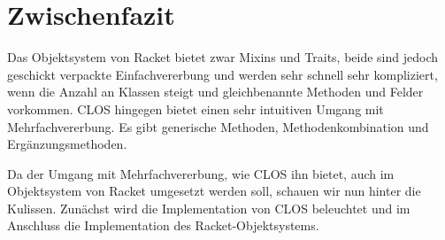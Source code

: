 \section{Zwischenfazit}
Das Objektsystem von Racket bietet zwar Mixins und Traits, beide sind jedoch geschickt verpackte Einfachvererbung und werden sehr schnell sehr kompliziert, wenn die Anzahl an Klassen steigt und gleichbenannte Methoden und Felder vorkommen. CLOS hingegen bietet einen sehr intuitiven Umgang mit Mehrfachvererbung. Es gibt generische Methoden, Methodenkombination und Ergänzungsmethoden.

Da der Umgang mit Mehrfachvererbung, wie CLOS ihn bietet, auch im Objektsystem von Racket umgesetzt werden soll, schauen wir nun hinter die Kulissen. Zunächst wird die Implementation von CLOS beleuchtet und im Anschluss die Implementation des Racket-Objektsystems.